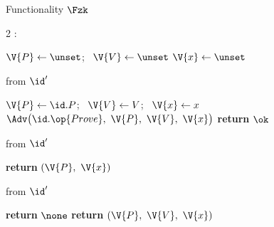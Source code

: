 \begin{interface}[nofloat]{Functionality $\Fzk$ \\
}

{\scriptsize
\setlength{\columnsep}{1.4em}
\begin{multicols}{2}
:
\begin{algorithmic}[1]
\setcounter{contline}{0}\algcont
\State $\V{P} \gets \unset$; \ $\V{V} \gets \unset$
\State $\V{x} \gets \unset$
\algsave
\end{algorithmic}
\vspace{1.4ex}

 \quad from $\id'$
\begin{algorithmic}[1]
\algcont
{}
 \label{ln:zksound}
\State $\V{P} \gets \id.P$; \ $\V{V} \gets V$; \ $\V{x} \gets x$
\State $\Adv\bigl(\id.\op{Prove},\ \V{P},\ \V{V},\ \V{x}\bigr)$ \label{ln:zkleak}
\State \textbf{return} $\ok$
\algsave
\end{algorithmic}
\vspace{1.4ex}

\columnbreak

 \quad from $\id'$
\begin{algorithmic}[1]
\algcont
{}
\State \textbf{return} $(\V{P},\ \V{x})$ \label{ln:zkread}
\algsave
\end{algorithmic}
\vspace{1.4ex}

 \quad from $\id'$
\begin{algorithmic}[1]
\algcont
{}
  \State \textbf{return} $\none$
\EndIf
\State \textbf{return} $(\V{P},\ \V{V},\ \V{x})$
\algsave
\end{algorithmic}
\end{multicols}}
\end{interface}
